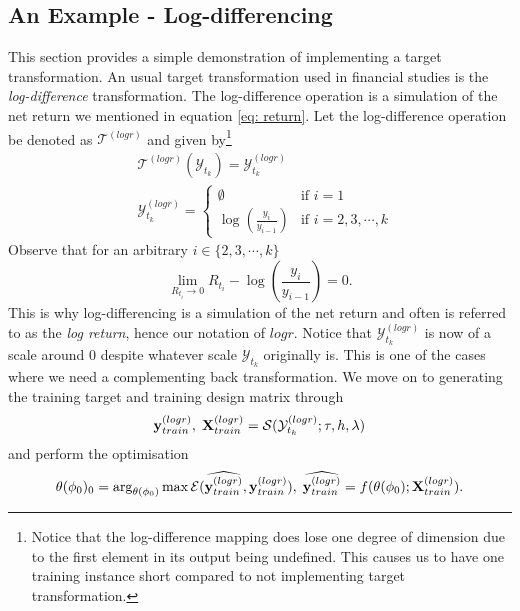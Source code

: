 \subsection{An Example - Log-differencing}
This section provides a simple demonstration of implementing a target transformation. An usual target transformation used in financial studies is the \textit{log-difference} transformation. The log-difference operation is a simulation of the net return we mentioned in equation \ref{eq: return}. Let the log-difference operation be denoted as $\mathcal{T}^{(logr)}$ and given by\footnote{Notice that the log-difference mapping does lose one degree of dimension due to the first element in its output being undefined. This causes us to have one training instance short compared to not implementing target transformation.}
\begin{align*}
    &\mathcal{T}^{(logr)}(\mathcal{Y}_{t_k}) = \mathcal{Y}^{(logr)}_{t_k} \\
    &\mathcal{Y}^{(logr)}_{t_k} = \begin{cases}
        \emptyset                  &\text{if $i = 1$} \\
        \log(\frac{y_i}{y_{i-1}})  &\text{if $i = 2, 3, \cdots, k$}
    \end{cases}
\end{align*}
Observe that for an arbitrary $i \in \{2, 3, \cdots, k \}$
\begin{equation*}
    \lim_{R_{t_i} \rightarrow 0}{R_{t_i} - \log(\frac{y_i}{y_{i-1}}) = 0}.
\end{equation*}
This is why log-differencing is a simulation of the net return and often is referred to as the \textit{log return}, hence our notation of $logr$. Notice that $\mathcal{Y}^{(logr)}_{t_k}$ is now of a scale around $0$ despite whatever scale $\mathcal{Y}_{t_k}$ originally is. This is one of the cases where we need a complementing back transformation. We move on to generating the training target and training design matrix through
\begin{equation*}
    \mathbf{y}^{(logr)}_{train}, \; \mathbf{X}^{(logr)}_{train} = \mathcal{S}(\mathcal{Y}^{(logr)}_{t_k}; \tau, h, \lambda)
\end{equation*}
and perform the optimisation
\begin{equation*}
    \theta(\phi_0)_0 = \arg_{\theta(\phi_0)} \max \mathcal{E}(\widehat{\mathbf{y}^{(logr)}_{train}}, \mathbf{y}^{(logr)}_{train}), \; \widehat{\mathbf{y}^{(logr)}_{train}} = f(\theta(\phi_0); \mathbf{X}^{(logr)}_{train}).
\end{equation*}
